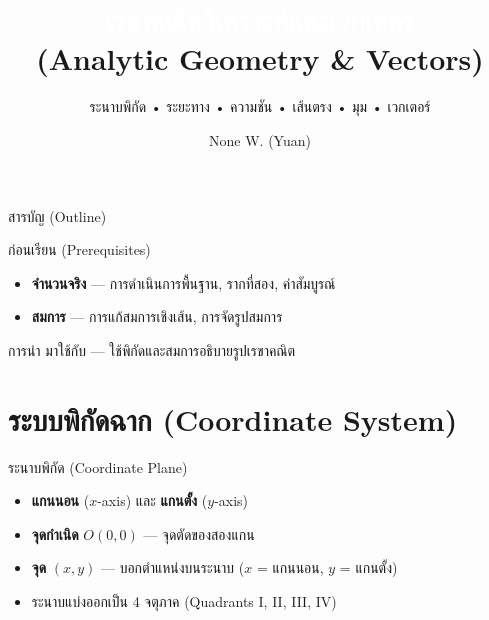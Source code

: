 \documentclass[11pt, aspectratio=169]{beamer}
\title[เรขาคณิตวิเคราะห์]{\textcolor{white}{เรขาคณิตวิเคราะห์และเวกเตอร์} \\ \textcolor{boxBlue!60}{(Analytic Geometry \& Vectors)}}
\subtitle{ระนาบพิกัด • ระยะทาง • ความชัน • เส้นตรง • มุม • เวกเตอร์ }
\author[None W. (Yuan)]{None W. (Yuan)}
\date{}
\begin{document}
\begin{frame}[plain]\titlepage\end{frame}
\begin{frame}{สารบัญ (Outline)}\tableofcontents\end{frame}

\begin{frame}{ก่อนเรียน (Prerequisites)}
  \begin{explanation}
    \begin{itemize}
      \item \textbf{จำนวนจริง} — การดำเนินการพื้นฐาน, รากที่สอง, ค่าสัมบูรณ์
      \item \textbf{สมการ} — การแก้สมการเชิงเส้น, การจัดรูปสมการ
    \end{itemize}
  \end{explanation}

  \begin{intuition}
    การนำ  มาใช้กับ 
    — ใช้พิกัดและสมการอธิบายรูปเรขาคณิต
  \end{intuition}
\end{frame}

\section{ระบบพิกัดฉาก (Coordinate System)}

\begin{frame}{ระนาบพิกัด (Coordinate Plane)}
  \begin{explanation}
    \begin{itemize}
      \item \textbf{แกนนอน} ($x$-axis) และ \textbf{แกนตั้ง} ($y$-axis)
      \item \textbf{จุดกำเนิด} $O(0, 0)$ — จุดตัดของสองแกน
      \item \textbf{จุด} $(x, y)$ — บอกตำแหน่งบนระนาบ ($x$ = แกนนอน, $y$ = แกนตั้ง)
      \item ระนาบแบ่งออกเป็น 4 จตุภาค (Quadrants I, II, III, IV)
    \end{itemize}
  \end{explanation}
\end{frame}
\end{document}
